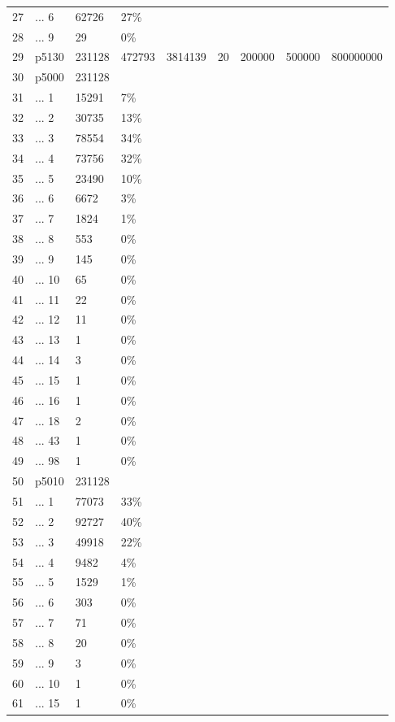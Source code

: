 \begin{tabular}{rllllllll}
  27 & ... 6 & 62726 & 27\% &  &  &  &  &  \\ 
  28 & ... 9 & 29 & 0\% &  &  &  &  &  \\ 
  29 & p5130 & 231128 & 472793 & 3814139 & 20 & 200000 & 500000 & 800000000 \\ 
  30 & p5000 & 231128 &  &  &  &  &  &  \\ 
  31 & ... 1 & 15291 & 7\% &  &  &  &  &  \\ 
  32 & ... 2 & 30735 & 13\% &  &  &  &  &  \\ 
  33 & ... 3 & 78554 & 34\% &  &  &  &  &  \\ 
  34 & ... 4 & 73756 & 32\% &  &  &  &  &  \\ 
  35 & ... 5 & 23490 & 10\% &  &  &  &  &  \\ 
  36 & ... 6 & 6672 & 3\% &  &  &  &  &  \\ 
  37 & ... 7 & 1824 & 1\% &  &  &  &  &  \\ 
  38 & ... 8 & 553 & 0\% &  &  &  &  &  \\ 
  39 & ... 9 & 145 & 0\% &  &  &  &  &  \\ 
  40 & ... 10 & 65 & 0\% &  &  &  &  &  \\ 
  41 & ... 11 & 22 & 0\% &  &  &  &  &  \\ 
  42 & ... 12 & 11 & 0\% &  &  &  &  &  \\ 
  43 & ... 13 & 1 & 0\% &  &  &  &  &  \\ 
  44 & ... 14 & 3 & 0\% &  &  &  &  &  \\ 
  45 & ... 15 & 1 & 0\% &  &  &  &  &  \\ 
  46 & ... 16 & 1 & 0\% &  &  &  &  &  \\ 
  47 & ... 18 & 2 & 0\% &  &  &  &  &  \\ 
  48 & ... 43 & 1 & 0\% &  &  &  &  &  \\ 
  49 & ... 98 & 1 & 0\% &  &  &  &  &  \\ 
  50 & p5010 & 231128 &  &  &  &  &  &  \\ 
  51 & ... 1 & 77073 & 33\% &  &  &  &  &  \\ 
  52 & ... 2 & 92727 & 40\% &  &  &  &  &  \\ 
  53 & ... 3 & 49918 & 22\% &  &  &  &  &  \\ 
  54 & ... 4 & 9482 & 4\% &  &  &  &  &  \\ 
  55 & ... 5 & 1529 & 1\% &  &  &  &  &  \\ 
  56 & ... 6 & 303 & 0\% &  &  &  &  &  \\ 
  57 & ... 7 & 71 & 0\% &  &  &  &  &  \\ 
  58 & ... 8 & 20 & 0\% &  &  &  &  &  \\ 
  59 & ... 9 & 3 & 0\% &  &  &  &  &  \\ 
  60 & ... 10 & 1 & 0\% &  &  &  &  &  \\ 
  61 & ... 15 & 1 & 0\% &  &  &  &  &  \\ 
   \hline
\end{tabular}

